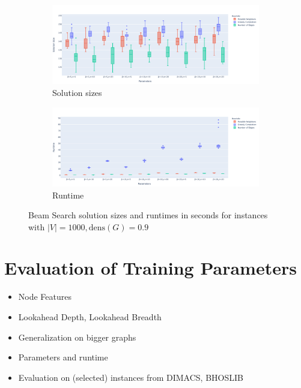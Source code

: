 \documentclass[draft,final]{vutinfth} %
\begin{document}
\begin{figure}
    \centering
    \begin{subfigure}{\textwidth}
        \centering
        \includegraphics[width=\textwidth]{graphics/lbh-09-1000-size.pdf}
        \caption{Solution sizes}
    \end{subfigure}
    \begin{subfigure}{\textwidth}
        \centering
        \includegraphics[width=\textwidth]{graphics/lbh-09-1000-runtime.pdf}
        \caption{Runtime}
    \end{subfigure}
    \caption{Beam Search solution sizes and runtimes in seconds for instances with $|V|=1000, \mathrm{dens}(G)=0.9$}
    \label{fig:bs-heuristics-random-4}
\end{figure}


\section{Evaluation of Training Parameters}\label{sec:lsbm-t}

\begin{itemize}
    \item Node Features
    \item Lookahead Depth, Lookahead Breadth
    \item Generalization on bigger graphs
    \item Parameters and runtime
    \item Evaluation on (selected) instances from DIMACS, BHOSLIB 
\end{itemize}
\end{document}
